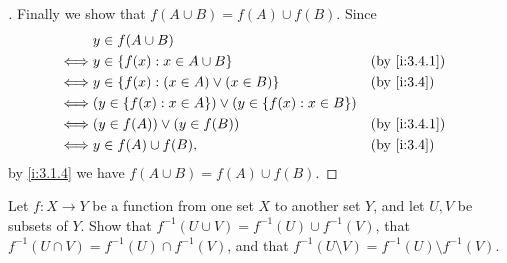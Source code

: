 \begin{proof}[]
  Finally we show that \(f(A \cup B) = f(A) \cup f(B)\).
  Since
  \begin{align*}
         & y \in f(A \cup B)                                                                      \\
    \iff & y \in \set{f(x) : x \in A \cup B}                                    &  & \by{i:3.4.1} \\
    \iff & y \in \set{f(x) : (x \in A) \lor (x \in B)}                          &  & \by{i:3.4}   \\
    \iff & \pa{y \in \set{f(x) : x \in A}} \lor \pa{y \in \set{f(x) : x \in B}}                   \\
    \iff & (y \in f(A)) \lor (y \in f(B))                                       &  & \by{i:3.4.1} \\
    \iff & y \in f(A) \cup f(B),                                                &  & \by{i:3.4}
  \end{align*}
  by \cref{i:3.1.4} we have \(f(A \cup B) = f(A) \cup f(B)\).
\end{proof}

\begin{ex}\label{i:ex:3.4.4}
  Let \(f : X \to Y\) be a function from one set \(X\) to another set \(Y\), and let \(U, V\) be subsets of \(Y\).
  Show that \(f^{-1}(U \cup V) = f^{-1}(U) \cup f^{-1}(V)\), that \(f^{-1}(U \cap V) = f^{-1}(U) \cap f^{-1}(V)\), and that \(f^{-1}(U \setminus V) = f^{-1}(U) \setminus f^{-1}(V)\).
\end{ex}


